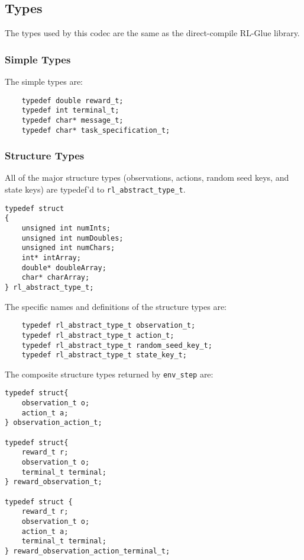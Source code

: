 \documentclass[11pt]{article}
\begin{document}
\subsection{Types}
The types used by this codec are the same as the direct-compile RL-Glue library.


\subsubsection{Simple Types}
The simple types are:

\begin{verbatim}
    typedef double reward_t;
    typedef int terminal_t;
    typedef char* message_t;
    typedef char* task_specification_t;
\end{verbatim}

\def\rat{rl\_abstract\_type\_t}

\subsubsection{Structure Types}
\label{sec:structure-types}
All of the major structure types (observations, actions, random seed keys, and state keys) are typedef'd to \texttt{\rat}.

\begin{verbatim}
typedef struct
{
    unsigned int numInts;
    unsigned int numDoubles;
    unsigned int numChars;
    int* intArray;
    double* doubleArray;
    char* charArray;
} rl_abstract_type_t;
\end{verbatim}

The specific names and definitions of the structure types are:
\begin{verbatim}
    typedef rl_abstract_type_t observation_t;
    typedef rl_abstract_type_t action_t;
    typedef rl_abstract_type_t random_seed_key_t;
    typedef rl_abstract_type_t state_key_t;
\end{verbatim}

The composite structure types returned by \texttt{env\_step} are:
\begin{verbatim}
typedef struct{
    observation_t o;
    action_t a;
} observation_action_t;

typedef struct{
    reward_t r;
    observation_t o;
    terminal_t terminal;
} reward_observation_t;

typedef struct {
    reward_t r;
    observation_t o;
    action_t a;
    terminal_t terminal;
} reward_observation_action_terminal_t;
\end{verbatim}
\end{document}
